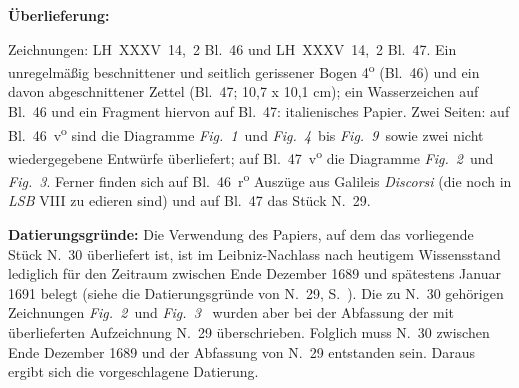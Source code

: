 %
%
%
%
%
%
\frenchspacing%
%
 \count{}
\count{}
\count{}
\begin{ledgroupsized}[r]{120mm}%
\footnotesize%
\pstart%
\noindent%
\textbf{Überlieferung:}%
\pend%
\end{ledgroupsized}%
\begin{ledgroupsized}[r]{114mm}%
\footnotesize%
\pstart%
\parindent -6mm%
%
Zeichnungen: LH~XXXV~14,~2 Bl.~46 und LH~XXXV~14,~2 Bl.~47.
Ein unregelmäßig beschnittener und seitlich gerissener Bogen 4\textsuperscript{o}\! (Bl.~46)
und ein davon abgeschnittener Zettel (Bl.~47; 10,7 x 10,1 cm); 
ein Wasserzeichen auf Bl.~46 und ein Fragment hiervon auf Bl.~47:
italienisches Papier.
Zwei Seiten: %
auf Bl.~46~v\textsuperscript{o} sind die Diagramme \lbrack\textit{Fig.~1}\rbrack\ und \lbrack\textit{Fig.~4}\rbrack\ bis \lbrack\textit{Fig.~9}\rbrack\ sowie zwei nicht wiedergegebene Entwürfe überliefert;
auf Bl.~47~v\textsuperscript{o} die Diagramme \lbrack\textit{Fig.~2}\rbrack\ und \lbrack\textit{Fig.~3}\rbrack.
Ferner finden sich auf Bl.~46~r\textsuperscript{o}\! Auszüge aus Galileis \textit{Discorsi} (die noch in \textit{LSB} VIII zu edieren sind)
und auf Bl.~47 das Stück N.~29.%
\protect{}
\pend%
\end{ledgroupsized}%
%
\vspace{5mm}%
\begin{ledgroup}%
\footnotesize%
\pstart%
\noindent%
\textbf{Datierungsgründe:}
Die Verwendung des Papiers, auf dem das vorliegende Stück N.~30 %
überliefert ist, ist im Leibniz-Nachlass nach heutigem Wissensstand lediglich für den Zeitraum zwischen Ende Dezember 1689 und spätestens Januar 1691 belegt (siehe die Datierungsgründe von N.~29, S.~\pageref{LH_35_14_02_047_datierung}).
Die zu N.~30 gehörigen Zeichnungen \lbrack\textit{Fig.~2}\rbrack\ und \lbrack\textit{Fig.~3}\rbrack\
wurden aber bei der Abfassung der mit überlieferten Aufzeichnung N.~29 überschrieben.
Folglich muss N.~30 zwischen Ende Dezember 1689 und der Abfassung von N.~29 entstanden sein.
Daraus ergibt sich die vorgeschlagene Datierung.
\pend%
\end{ledgroup}%
